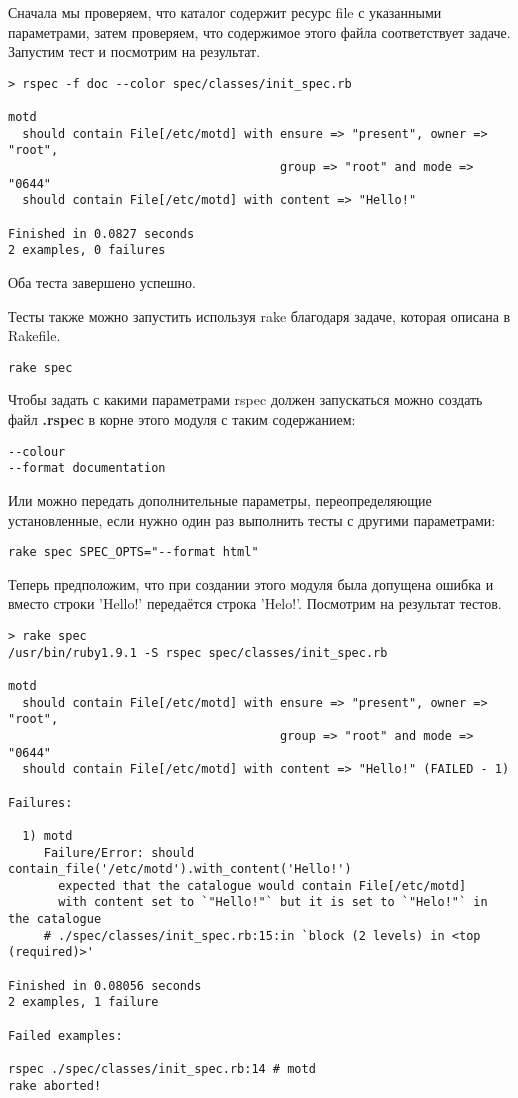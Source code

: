 Сначала мы проверяем, что каталог содержит ресурс file с указанными параметрами, затем проверяем, что содержимое этого файла соответствует задаче. Запустим тест и посмотрим на результат.

\begin{verbatim}
> rspec -f doc --color spec/classes/init_spec.rb 

motd
  should contain File[/etc/motd] with ensure => "present", owner => "root",
                                      group => "root" and mode => "0644"
  should contain File[/etc/motd] with content => "Hello!"

Finished in 0.0827 seconds
2 examples, 0 failures
\end{verbatim}

Оба теста завершено успешно.

Тесты также можно запустить используя rake благодаря задаче, которая описана в Rakefile.

\begin{verbatim}
rake spec
\end{verbatim}

Чтобы задать с какими параметрами rspec должен запускаться можно создать файл \textbf{.rspec} в корне этого модуля с таким содержанием:

\begin{verbatim}
--colour
--format documentation
\end{verbatim}

Или можно передать дополнительные параметры, переопределяющие установленные, если нужно один раз выполнить тесты с другими параметрами:

\begin{verbatim}
rake spec SPEC_OPTS="--format html"
\end{verbatim}

Теперь предположим, что при создании этого модуля была допущена ошибка и вместо строки 'Hello!' передаётся строка 'Helo!'. Посмотрим на результат тестов.

\begin{verbatim}
> rake spec
/usr/bin/ruby1.9.1 -S rspec spec/classes/init_spec.rb

motd
  should contain File[/etc/motd] with ensure => "present", owner => "root",
                                      group => "root" and mode => "0644"
  should contain File[/etc/motd] with content => "Hello!" (FAILED - 1)

Failures:

  1) motd 
     Failure/Error: should contain_file('/etc/motd').with_content('Hello!')
       expected that the catalogue would contain File[/etc/motd]
       with content set to `"Hello!"` but it is set to `"Helo!"` in the catalogue
     # ./spec/classes/init_spec.rb:15:in `block (2 levels) in <top (required)>'

Finished in 0.08056 seconds
2 examples, 1 failure

Failed examples:

rspec ./spec/classes/init_spec.rb:14 # motd 
rake aborted!
\end{verbatim}

